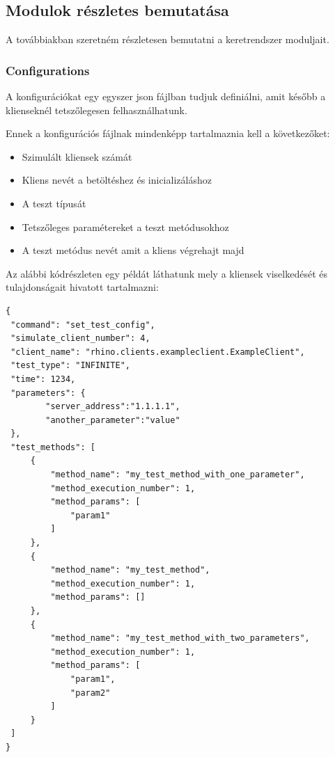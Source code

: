 \documentclass[a4paper,12pt,oneside]{report}
\begin{document}
\subsection{Modulok részletes bemutatása}

A továbbiakban szeretném részletesen bemutatni a keretrendszer moduljait.

\subsubsection{Configurations} \label{sssec:configurations}

A konfigurációkat egy egyszer json fájlban tudjuk definiálni, amit később a klienseknél tetszőlegesen felhasználhatunk.

Ennek a konfigurációs fájlnak mindenképp tartalmaznia kell a következőket:
\begin{itemize}
    \itemsep0em
        \item Szimulált kliensek számát
        \item Kliens nevét a betöltéshez és inicializáláshoz
        \item A teszt típusát
        \item Tetszőleges paramétereket a teszt metódusokhoz
        \item A teszt metódus nevét amit a kliens végrehajt majd
\end{itemize}

Az alábbi kódrészleten egy példát láthatunk mely a kliensek viselkedését és tulajdonságait hivatott tartalmazni:

\begin{lstlisting}
{
 "command": "set_test_config",
 "simulate_client_number": 4,
 "client_name": "rhino.clients.exampleclient.ExampleClient",
 "test_type": "INFINITE",
 "time": 1234,
 "parameters": {
        "server_address":"1.1.1.1",
        "another_parameter":"value"
 },
 "test_methods": [
     {
         "method_name": "my_test_method_with_one_parameter",
         "method_execution_number": 1,
         "method_params": [
             "param1"
         ]
     },
     {
         "method_name": "my_test_method",
         "method_execution_number": 1,
         "method_params": []
     },
     {
         "method_name": "my_test_method_with_two_parameters",
         "method_execution_number": 1,
         "method_params": [
             "param1",
             "param2"
         ]
     }
 ]
}
\end{lstlisting}
\end{document}
